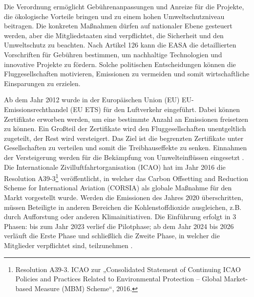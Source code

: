 Die Verordnung ermöglicht Gebührenanpassungen und Anreize für die Projekte, 
die ökologische Vorteile bringen und zu einem hohen Umweltschutzniveau beitragen.
%
Die konkreten Maßnahmen dürfen auf nationaler Ebene gesteuert werden, 
aber die Mitgliedstaaten sind verpflichtet, die Sicherheit und den Umweltschutz zu beachten. 
Nach Artikel 126 kann die EASA die detaillierten 
Vorschriften für Gebühren bestimmen, um nachhaltige Technologien und innovative Projekte zu fördern.
%
%
Solche politischen Entscheidungen können die Fluggesellschaften motivieren, 
Emissionen zu vermeiden und somit wirtschaftliche Einsparungen zu erzielen.

Ab dem Jahr 2012 wurde in der Europäischen Union (EU) EU-Emissionsrechthandel (EU ETS) für den Luftverkehr eingeführt.
Dabei können Zertifikate erworben werden, um eine bestimmte Anzahl an Emissionen freisetzen zu können.
Ein Großteil der Zertifikate wird den Fluggesellschaften unentgeltlich zugeteilt, der Rest wird versteigert. 
Das Ziel ist die begrenzten Zertifikate unter Gesellschaften zu verteilen und somit die Treibhauseffekte zu senken.
Einnahmen der Versteigerung werden für die Bekämpfung von Umwelteinflüssen eingesetzt \cite{conrady2019luftverkehr}.
Die Internationale Zivilluftfahrtorganisation (ICAO) hat im Jahr 2016 die Resolution A39-3\footnote{Resolution A39-3. ICAO zur „Consolidated Statement of Continuing ICAO Policies and Practices Related to Environmental Protection – Global Market-based Measure (MBM) Scheme“, 2016.} veröffentlicht, 
in welcher das Carbon Offsetting and Reduction Scheme for International Aviation (CORSIA) 
als globale Maßnahme für den Markt vorgestellt wurde. 
Werden die Emissionen des Jahres 2020 überschritten, müssen Beteiligte in anderen Bereichen 
die Kohlenstoffdioxide ausgleichen, z.B. durch Aufforstung oder anderen Klimainitiativen. 
Die Einführung erfolgt in 3 Phasen: 
bis zum Jahr 2023 verlief die Pilotphase; ab dem Jahr 2024 bis 2026 verläuft die Erste Phase und schließlich die Zweite Phase, 
in welcher die Mitglieder verpflichtet sind, teilzunehmen \cite{conrady2019luftverkehr}. 


